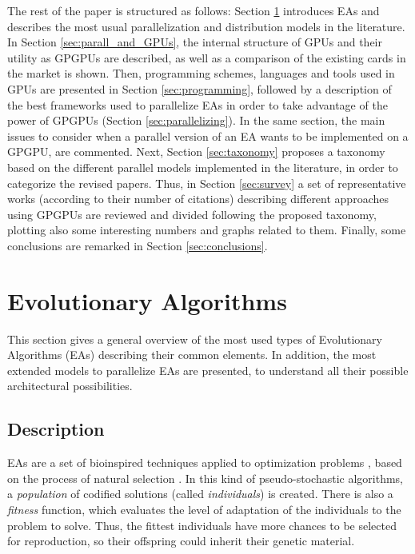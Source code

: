 \documentclass{article}
\begin{document}
The rest of the paper is structured as follows: 
Section \ref{sec:eas} introduces EAs and describes the most usual parallelization and distribution models in the literature. 
In Section \ref{sec:parall_and_GPUs}, the internal structure of GPUs
and their utility as GPGPUs are described, as well as a
comparison of the existing cards in the market is shown. 
Then, programming schemes, languages and tools used in GPUs are
presented in Section \ref{sec:programming}, followed by a description
of the best frameworks used to parallelize EAs in order to take
advantage of the power of GPGPUs (Section \ref{sec:parallelizing}). In
the same section, the main issues to consider when a parallel version of
an EA wants to be implemented on a GPGPU, are commented.  
Next, Section \ref{sec:taxonomy} proposes a taxonomy based on the different parallel models implemented in the literature, in order to categorize the revised papers. Thus, in Section \ref{sec:survey} a set of representative works (according to their number of citations) describing different approaches using GPGPUs are reviewed and divided following the proposed taxonomy, plotting also some interesting numbers and graphs related to them.
Finally, some conclusions are remarked in Section \ref{sec:conclusions}.


\section{Evolutionary Algorithms}
\label{sec:eas}

This section gives a general overview of the most used types of Evolutionary Algorithms (EAs) describing their common elements. In addition, the most extended models to parallelize EAs are presented, to understand all their possible architectural possibilities. 

\subsection{Description}
\label{subsec:eas-description}

EAs are a set of bioinspired techniques applied to optimization problems \cite{eiben2010whatis}, based on the process of natural selection \cite{darwin1859}. In this kind of pseudo-stochastic algorithms, a \textit{population} of codified solutions (called \textit{individuals}) is created. There is also a \textit{fitness} function, which evaluates the level of adaptation of the individuals to the problem to solve.
Thus, the fittest individuals have more chances to be selected for reproduction, so their offspring could inherit their genetic material. 
\end{document}
